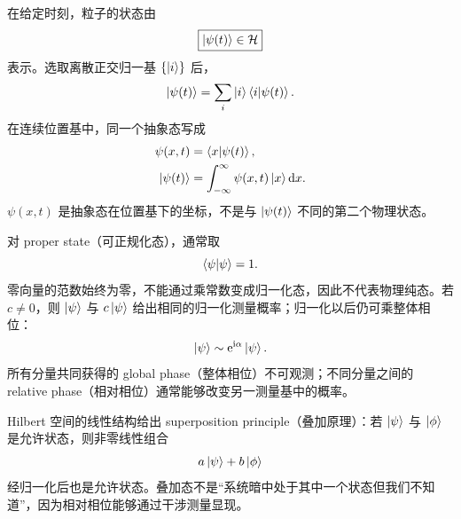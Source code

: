

在给定时刻，粒子的状态由
\begin{equation}
  \boxed{\left|\psi(t)\right\rangle\in\mathcal{H}}
  \label{eq:QM-C04-S01-state-postulate}
\end{equation}
表示。选取离散正交归一基 $\{\left|i\right\rangle\}$ 后，
\begin{equation}
  \left|\psi(t)\right\rangle
  =\sum_i\left|i\right\rangle\left\langle i \middle| \psi(t) \right\rangle.
  \label{eq:QM-C04-S01-discrete-state-expansion}
\end{equation}
在连续位置基中，同一个抽象态写成
\begin{align}
  \psi(x,t)&=\left\langle x \middle| \psi(t) \right\rangle,
  \label{eq:QM-C04-S01-position-wavefunction}\\
  \left|\psi(t)\right\rangle
  &=\int_{-\infty}^{\infty}
    \psi(x,t)\left|x\right\rangle\mathop{}\!\mathrm{d} x.
  \label{eq:QM-C04-S01-position-reconstruction}
\end{align}
$\psi(x,t)$ 是抽象态在位置基下的坐标，不是与 $\left|\psi(t)\right\rangle$ 不同的第二个物理状态。

对 proper state（可正规化态），通常取
\begin{equation}
  \left\langle \psi \middle| \psi \right\rangle=1.
  \label{eq:QM-C04-S01-normalization}
\end{equation}
零向量的范数始终为零，不能通过乘常数变成归一化态，因此不代表物理纯态。若 $c\neq0$，则 $\left|\psi\right\rangle$ 与 $c\left|\psi\right\rangle$ 给出相同的归一化测量概率；归一化以后仍可乘整体相位：
\begin{equation}
  \left|\psi\right\rangle\sim\mathrm{e}^{\mathrm{i}\alpha}\left|\psi\right\rangle.
  \label{eq:QM-C04-S01-global-phase-equivalence}
\end{equation}
所有分量共同获得的 global phase（整体相位）不可观测；不同分量之间的 relative phase（相对相位）通常能够改变另一测量基中的概率。

Hilbert 空间的线性结构给出 superposition principle（叠加原理）：若 $\left|\psi\right\rangle$ 与 $\left|\phi\right\rangle$ 是允许状态，则非零线性组合
\[
  a\left|\psi\right\rangle+b\left|\phi\right\rangle
\]
经归一化后也是允许状态。叠加态不是“系统暗中处于其中一个状态但我们不知道”，因为相对相位能够通过干涉测量显现。



